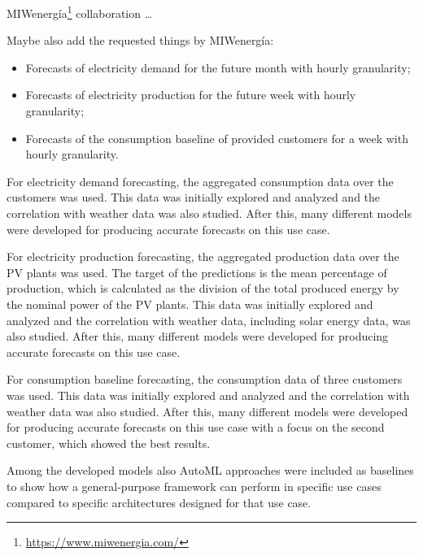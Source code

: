MIWenergía\footnote{ \url{https://www.miwenergia.com/} } collaboration …

Maybe also add the requested things by MIWenergía:
\begin{itemize}
  \item Forecasts of electricity demand for the future month with hourly granularity;
  \item Forecasts of electricity production for the future week with hourly granularity;
  \item Forecasts of the consumption baseline of provided customers for a week with hourly granularity.
\end{itemize}


For electricity demand forecasting, the aggregated consumption data over the customers was used.
This data was initially explored and analyzed and the correlation with weather data was also studied.
After this, many different models were developed for producing accurate forecasts on this use case.

For electricity production forecasting, the aggregated production data over the PV plants was used.
The target of the predictions is the mean percentage of production, which is calculated as the division of the total produced energy by the nominal power of the PV plants.
This data was initially explored and analyzed and the correlation with weather data, including solar energy data, was also studied.
After this, many different models were developed for producing accurate forecasts on this use case.

For consumption baseline forecasting, the consumption data of three customers was used.
This data was initially explored and analyzed and the correlation with weather data was also studied.
After this, many different models were developed for producing accurate forecasts on this use case with a focus on the second customer, which showed the best results.

Among the developed models also AutoML approaches were included as baselines to show how a general-purpose framework can perform in specific use cases compared to specific architectures designed for that use case.



